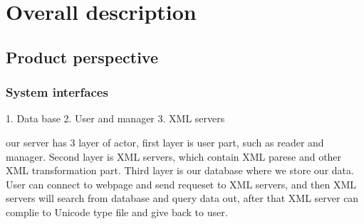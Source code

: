 \section{Overall description}


\subsection{Product perspective}


\subsubsection{System interfaces}
1. Data base
2. User and manager
3. XML servers

our server has 3 layer of actor, first layer is user part, such as reader and manager. 
Second layer is XML servers, which contain XML parese and other XML transformation part.
Third layer is our database where we store our data. 
User can connect to webpage and send requeset to XML servers,
and then XML servers will search from database and query data out, after that XML server can complie to Unicode type file and give back to user. 


